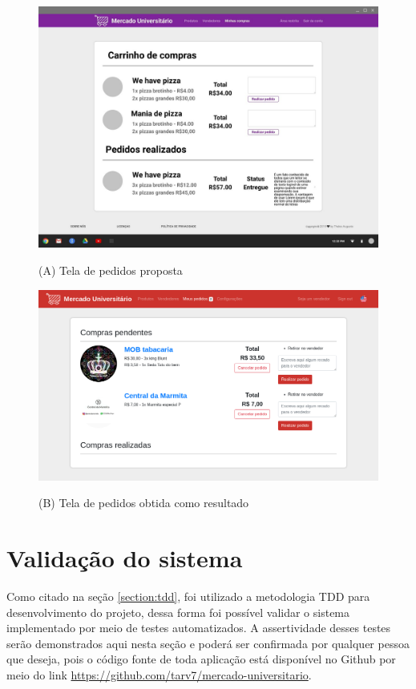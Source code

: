 \begin{figure}[htbp!]
  \centering
  \caption{(A) Tela de pedidos proposta}
  \includegraphics[width=1\textwidth]{figs/mockup/carrinho.jpg}
    \label{fig:mockup_pedidos}
\end{figure}

\begin{figure}[htbp!]
  \centering
  \caption{(B) Tela de pedidos obtida como resultado}
  \includegraphics[width=1\textwidth]{figs/resultado/carrinho.png}
    \label{fig:real_pedidos}
\end{figure}

\section{Validação do sistema}

Como citado na seção \ref{section:tdd}, foi utilizado a metodologia TDD para desenvolvimento do projeto, dessa forma foi possível validar o sistema implementado por meio de testes automatizados. A assertividade desses testes serão demonstrados aqui nesta seção e poderá ser confirmada por qualquer pessoa que deseja, pois o código fonte de toda aplicação está disponível no Github por meio do link \url{https://github.com/tarv7/mercado-universitario}.

